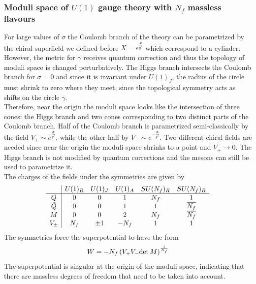 \subsubsection{Moduli space of $U(1)$ gauge theory with $N_f$ massless flavours }
For large values of $\sigma$ the Coulomb branch of the theory can be parametrized by the chiral superfield we defined before $X = e^{\frac{\Phi}{g^2}} $ which correspond to a cylinder.
However, the metric for $\gamma$ receives quantum correction and thus the topology of moduli space is changed perturbatively.
The Higgs branch intersects the Coulomb branch for $\sigma=0$ and since it is invariant under $U(1)_J$, the radius of the circle must shrink to zero where they meet, since the topological symmetry acts as shifts on the circle $\gamma$.
\\
Therefore, near the origin the moduli space looks like the intersection of three cones: the Higgs branch and two cones corresponding to two distinct parts of the Coulomb branch.
Half of the Coulomb branch is parametrized semi-classically by the field $V_+ \sim e^{\frac{\Phi}{g^2}}$, while the other half by $V_- \sim e^{ -\frac{\Phi}{g^2} }$. 
Two different chiral fields are needed since near the origin the moduli space shrinks to a point and $V_+ \rightarrow 0$. 
The Higgs branch is not modified by quantum corrections and the mesons can still be used to parametrize it.\\
The charges of the fields under the symmetries are given by
 \begin{equation}
 \begin{array}{ c | c c c c c }
  & U(1)_R &  U(1)_J & U(1)_A & SU(N_f)_R & SU(N_f)_R \\
 \hline
 Q & 0 & 0  & 1 & N_f & 1  \\  
 \tilde{Q} & 0 & 0  & 1 & 1 & \overline{N_f}  \\  
   M & 0 &  0 & 2 & N_f & \overline{N_f}\\  
   V_{\pm} & N_f & \pm 1  & -N_f & 1  &  1\\
 \end{array}
\end{equation}
The symmetries force the superpotential to have the form
\begin{equation}
W = - N_f \left(  V_+ V_- \mathrm{det } \,{ M} \right)^{\frac{1}{N_f}}
\end{equation}
The superpotential is singular at the origin of the moduli space, indicating that there are massless degrees of freedom that need to be taken into account.\\
